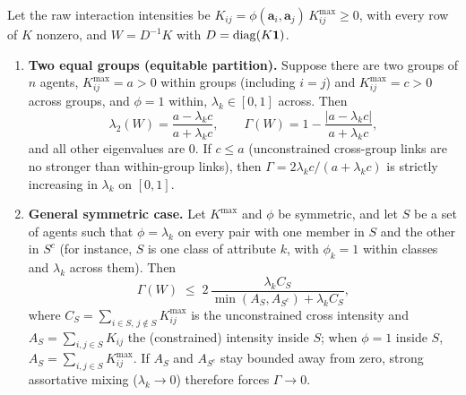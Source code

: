 \documentclass[../structural_economics_book.tex]{subfiles}
\begin{document}
\begin{proposition}\label{ch18:prop:assortative}
Let the raw interaction intensities be $K_{ij} = \phi(\mathbf{a}_i,\mathbf{a}_j)\,K^{\max}_{ij} \ge 0$, with every row of $K$ nonzero, and $W = D^{-1}K$ with $D = \operatorname{diag}(K\mathbf{1})$.
\begin{enumerate}
\item[(a)] \textbf{Two equal groups (equitable partition).} Suppose there are two groups of $n$ agents, $K^{\max}_{ij} = a > 0$ within groups (including $i = j$) and $K^{\max}_{ij} = c > 0$ across groups, and $\phi = 1$ within, $\lambda_k \in [0,1]$ across. Then
\begin{equation}\label{ch18:eq:assortative_gamma}
\lambda_2(W) = \frac{a - \lambda_k c}{a + \lambda_k c}, \qquad \Gamma(W) = 1 - \frac{|a - \lambda_k c|}{a + \lambda_k c},
\end{equation}
and all other eigenvalues are $0$. If $c \le a$ (unconstrained cross-group links are no stronger than within-group links), then $\Gamma = 2\lambda_k c/(a + \lambda_k c)$ is strictly increasing in $\lambda_k$ on $[0,1]$.
\item[(b)] \textbf{General symmetric case.} Let $K^{\max}$ and $\phi$ be symmetric, and let $S$ be a set of agents such that $\phi = \lambda_k$ on every pair with one member in $S$ and the other in $S^c$ (for instance, $S$ is one class of attribute $k$, with $\phi_k = 1$ within classes and $\lambda_k$ across them). Then
\[
\Gamma(W) \;\le\; 2\,\frac{\lambda_k C_S}{\min(A_S, A_{S^c}) + \lambda_k C_S},
\]
where $C_S = \sum_{i\in S,\, j\notin S} K^{\max}_{ij}$ is the unconstrained cross intensity and $A_S = \sum_{i,j\in S} K_{ij}$ the (constrained) intensity inside $S$; when $\phi = 1$ inside $S$, $A_S = \sum_{i,j\in S} K^{\max}_{ij}$. If $A_S$ and $A_{S^c}$ stay bounded away from zero, strong assortative mixing ($\lambda_k \to 0$) therefore forces $\Gamma \to 0$.
\end{enumerate}
\end{proposition}
\end{document}
